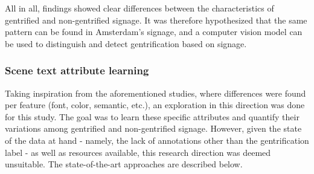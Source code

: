 All in all, findings showed clear differences between the characteristics of gentrified and non-gentrified signage. It was therefore hypothesized that the same pattern can be found in Amsterdam's signage, and a computer vision model can be used to distinguish and detect gentrification based on signage.

\subsubsection{Scene text attribute learning}

Taking inspiration from the aforementioned studies, where differences were found per feature (font, color, semantic, etc.), an exploration in this direction was done for this study. The goal was to learn these specific attributes and quantify their variations among gentrified and non-gentrified signage. However, given the state of the data at hand - namely, the lack of annotations other than the gentrification label - as well as resources available, this research direction was deemed unsuitable. The state-of-the-art approaches are described below.

